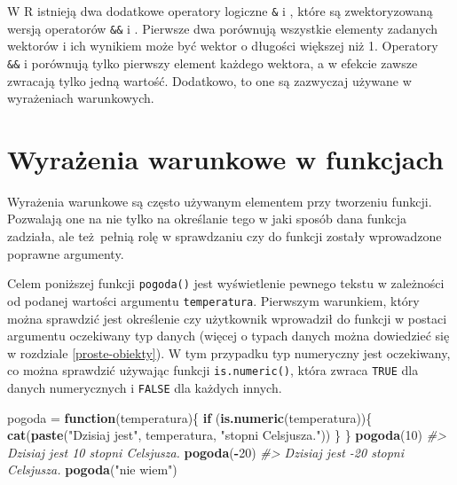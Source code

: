 \documentclass[paper=6in:9in,pagesize=pdftex,headinclude=on,footinclude=on,10pt]{scrbook}
\makeatletter
\newenvironment{Shaded}{\begin{snugshade}}{\end{snugshade}}
\newcommand{\CommentTok}[1]{\textcolor[rgb]{0.56,0.35,0.01}{\textit{#1}}}
\newcommand{\ControlFlowTok}[1]{\textcolor[rgb]{0.13,0.29,0.53}{\textbf{#1}}}
\newcommand{\DecValTok}[1]{\textcolor[rgb]{0.00,0.00,0.81}{#1}}
\newcommand{\KeywordTok}[1]{\textcolor[rgb]{0.13,0.29,0.53}{\textbf{#1}}}
\newcommand{\NormalTok}[1]{#1}
\newcommand{\OperatorTok}[1]{\textcolor[rgb]{0.81,0.36,0.00}{\textbf{#1}}}
\newcommand{\StringTok}[1]{\textcolor[rgb]{0.31,0.60,0.02}{#1}}
\newenvironment{kframe}{%
\medskip{}
\setlength{\fboxsep}{.8em}
 \def\at@end@of@kframe{}%
 \ifinner\ifhmode%
  \def\at@end@of@kframe{\end{minipage}}%
  \begin{minipage}{\columnwidth}%
 \fi\fi%
 \def\FrameCommand##1{\hskip\@totalleftmargin \hskip-\fboxsep
 \colorbox{shadecolor}{##1}\hskip-\fboxsep
     \hskip-\linewidth \hskip-\@totalleftmargin \hskip\columnwidth}%
 \MakeFramed {\advance\hsize-\width
   \@totalleftmargin\z@ \linewidth\hsize
   \@setminipage}}%
 {\par\unskip\endMakeFramed%
 \at@end@of@kframe}
\newenvironment{rmdblock}[1]
  {
  \begin{itemize}
  \renewcommand{\labelitemi}{
    \raisebox{-.7\height}[0pt][0pt]{
      {\setkeys{Gin}{width=3em,keepaspectratio}\texttt{[image: images/\#1]}}
    }
  }
  \setlength{\fboxsep}{1em}
  \begin{kframe}
  \item
  }
  {
  \end{kframe}
  \end{itemize}
  }
\newenvironment{rmdinfo}
  {\begin{rmdblock}{compass}}
  {\end{rmdblock}}
\makeatother
\begin{document}
\begin{rmdinfo}
\begin{rmdinfo}

W R istnieją dwa dodatkowe operatory logiczne \texttt{\&} i \texttt{\textbar{}}, które są zwektoryzowaną wersją operatorów \texttt{\&\&} i \texttt{\textbar{}\textbar{}}.
Pierwsze dwa porównują wszystkie elementy zadanych wektorów i ich wynikiem może być wektor o długości większej niż 1.
Operatory \texttt{\&\&} i \texttt{\textbar{}\textbar{}} porównują tylko pierwszy element każdego wektora, a w efekcie zawsze zwracają tylko jedną wartość.
Dodatkowo, to one są zazwyczaj używane w wyrażeniach warunkowych.

\end{rmdinfo}
\end{rmdinfo}

\hypertarget{wwwf}{%
\section{Wyrażenia warunkowe w funkcjach}\label{wwwf}}

Wyrażenia warunkowe są często używanym elementem przy tworzeniu funkcji.
Pozwalają one na nie tylko na określanie tego w jaki sposób dana funkcja zadziała, ale też~pełnią rolę w sprawdzaniu czy do funkcji zostały wprowadzone poprawne argumenty.

Celem poniższej funkcji \texttt{pogoda()} jest wyświetlenie pewnego tekstu w zależności od podanej wartości argumentu \texttt{temperatura}.
Pierwszym warunkiem, który można sprawdzić jest określenie czy użytkownik wprowadził do funkcji w postaci argumentu oczekiwany typ danych (więcej o typach danych można dowiedzieć się w rozdziale \ref{proste-obiekty}).
W tym przypadku typ numeryczny jest oczekiwany, co można sprawdzić używając funkcji \texttt{is.numeric()}, która zwraca \texttt{TRUE} dla danych numerycznych i \texttt{FALSE} dla każdych innych.

\begin{Shaded}
\begin{Highlighting}[]
\NormalTok{pogoda =}\StringTok{ }\ControlFlowTok{function}\NormalTok{(temperatura)\{}
  \ControlFlowTok{if}\NormalTok{ (}\KeywordTok{is.numeric}\NormalTok{(temperatura))\{}
    \KeywordTok{cat}\NormalTok{(}\KeywordTok{paste}\NormalTok{(}\StringTok{"Dzisiaj jest"}\NormalTok{, temperatura, }\StringTok{"stopni Celsjusza."}\NormalTok{))}
\NormalTok{  \}}
\NormalTok{\}}
\KeywordTok{pogoda}\NormalTok{(}\DecValTok{10}\NormalTok{)}
\CommentTok{#> Dzisiaj jest 10 stopni Celsjusza.}
\KeywordTok{pogoda}\NormalTok{(}\OperatorTok{-}\DecValTok{20}\NormalTok{)}
\CommentTok{#> Dzisiaj jest -20 stopni Celsjusza.}
\KeywordTok{pogoda}\NormalTok{(}\StringTok{"nie wiem"}\NormalTok{)}
\end{Highlighting}
\end{Shaded}
\end{document}
